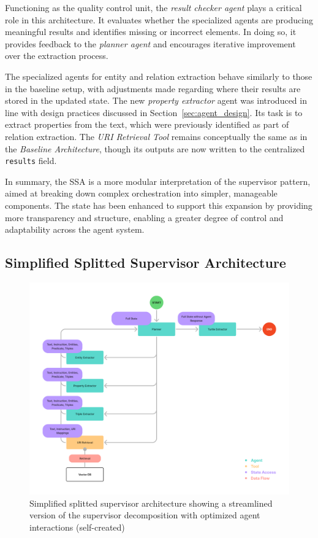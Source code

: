 \documentclass[a4paper,oneside,bibliography=totoc]{scrbook}
\begin{document}
Functioning as the quality control unit, the \textit{result checker agent} plays a critical role in this architecture. It evaluates whether the specialized agents are producing meaningful results and identifies missing or incorrect elements. In doing so, it provides feedback to the \textit{planner agent} and encourages iterative improvement over the extraction process.

The specialized agents for entity and relation extraction behave similarly to those in the baseline setup, with adjustments made regarding where their results are stored in the updated state. The new \textit{property extractor} agent was introduced in line with design practices discussed in Section~\ref{sec:agent_design}. Its task is to extract properties from the text, which were previously identified as part of relation extraction. The \textit{URI Retrieval Tool} remains conceptually the same as in the \textit{Baseline Architecture}, though its outputs are now written to the centralized \texttt{results} field.

In summary, the \ac{SSA} is a more modular interpretation of the supervisor pattern, aimed at breaking down complex orchestration into simpler, manageable components. The state has been enhanced to support this expansion by providing more transparency and structure, enabling a greater degree of control and adaptability across the agent system.

\subsection{Simplified Splitted Supervisor Architecture}
\label{subsec:simplified_splitted_supervisor}

\begin{figure}[h]
  \centering
  \includegraphics[width=\textwidth]{figures/Simplified Splitted Supervisor Architecture.png}
  \caption[Simplified splitted supervisor architecture showing a streamlined version of the supervisor decomposition with optimized agent interactions]{Simplified splitted supervisor architecture showing a streamlined version of the supervisor decomposition with optimized agent interactions (self-created)}
  \label{fig:simplified_splitted_supervisor_architecture}
\end{figure}
\end{document}
